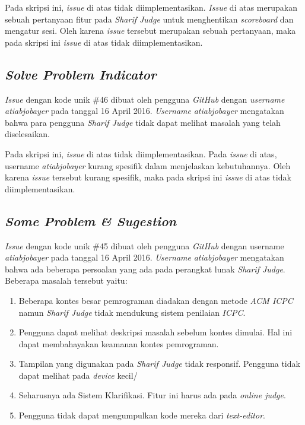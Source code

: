Pada skripsi ini, \textit{issue} di atas tidak diimplementasikan. \textit{Issue} di atas merupakan sebuah pertanyaan fitur pada \textit{Sharif Judge} untuk menghentikan \textit{scoreboard} dan mengatur sesi. Oleh karena \textit{issue} tersebut merupakan sebuah pertanyaan, maka pada skripsi ini \textit{issue} di atas tidak diimplementasikan.

\subsection{\textit{Solve Problem Indicator}}
\textit{Issue} dengan kode unik \#46 dibuat oleh pengguna \textit{GitHub} dengan \textit{username} \textit{atiabjobayer} pada tanggal 16 April 2016. \textit{Username} \textit{atiabjobayer} mengatakan bahwa para pengguna \textit{Sharif Judge} tidak dapat melihat masalah yang telah diselesaikan.

Pada skripsi ini, \textit{issue} di atas tidak diimplementasikan. Pada \textit{issue} di atas, username \textit{atiabjobayer} kurang spesifik dalam menjelaskan kebutuhannya. Oleh karena \textit{issue} tersebut kurang spesifik, maka pada skripsi ini \textit{issue} di atas tidak diimplementasikan.

\subsection{\textit{Some Problem \& Sugestion}}
\textit{Issue} dengan kode unik \#45 dibuat oleh pengguna \textit{GitHub} dengan username \textit{atiabjobayer} pada tanggal 16 April 2016. \textit{Username} \textit{atiabjobayer} mengatakan bahwa ada beberapa persoalan yang ada pada perangkat lunak \textit{Sharif Judge}. Beberapa masalah tersebut yaitu:
	\begin{enumerate}
		\item Beberapa kontes besar pemrograman diadakan dengan metode \textit{ACM ICPC} namun \textit{Sharif Judge} tidak mendukung sistem penilaian \textit{ICPC}.
		\item Pengguna dapat melihat deskripsi masalah sebelum kontes dimulai. Hal ini dapat membahayakan keamanan kontes pemrograman.
		\item Tampilan yang digunakan pada \textit{Sharif Judge} tidak responsif. Pengguna tidak dapat melihat pada \textit{device} kecil/
		\item Seharusnya ada Sistem Klarifikasi. Fitur ini harus ada pada \textit{online judge}.
		\item Pengguna tidak dapat mengumpulkan kode mereka dari \textit{text-editor}.
	\end{enumerate}

